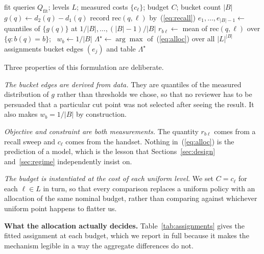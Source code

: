 \documentclass[journal]{IEEEtran}
\begin{document}
\begin{algorithm}[!t]
\caption{Fitting the allocation, offline, once per index}
\label{alg:fit}
\begin{algorithmic}[1]
\Require fit queries $Q_{\mathrm{fit}}$; levels $L$; measured costs
         $\{c_\ell\}$; budget $C$; bucket count $|B|$
  \State $g(q) \gets d_2(q) - d_1(q)$ 
   \State record $\mathrm{rec}(q,\ell)$ by~(\ref{eq:recall})
  \EndFor
\EndFor
\State $e_1,\dots,e_{|B|-1} \gets$ quantiles of $\{g(q)\}$ at
       $1/|B|, \dots, (|B|-1)/|B|$
\State $r_{b\ell} \gets$ mean of $\mathrm{rec}(q,\ell)$ over
       $\{q : b(q) = b\}$; \ $w_b \gets 1/|B|$
\State $\Lambda^\star \gets \arg\max$ of~(\ref{eq:alloc}) over all $|L|^{|B|}$
       assignments
\State \Return bucket edges $(e_j)$ and table $\Lambda^\star$
\end{algorithmic}
\end{algorithm}

Three properties of this formulation are deliberate.

\emph{The bucket edges are derived from data.} They are quantiles of the
measured distribution of $g$ rather than thresholds we chose, so that no
reviewer has to be persuaded that a particular cut point was not selected
after seeing the result. It also makes $w_b = 1/|B|$ by construction.

\emph{Objective and constraint are both measurements.} The quantity
$r_{b\ell}$ comes from a recall sweep and $c_\ell$ comes from the handset.
Nothing in~(\ref{eq:alloc}) is the prediction of a model, which is the
lesson that Sections~\ref{sec:design} and~\ref{sec:regime} independently
insist on.

\emph{The budget is instantiated at the cost of each uniform level.} We set
$C = c_\ell$ for each $\ell \in L$ in turn, so that every comparison
replaces a uniform policy with an allocation of the same nominal budget,
rather than comparing against whichever uniform point happens to flatter
us.

\textbf{What the allocation actually decides.}
Table~\ref{tab:assignments} gives the fitted assignment at each budget,
which we report in full because it makes the mechanism legible in a way the
aggregate differences do not.
\end{document}

